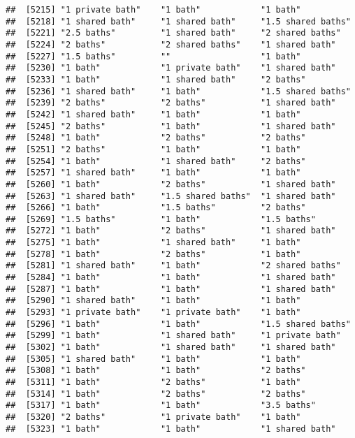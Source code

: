 \documentclass[
]{article}
\begin{document}
\begin{verbatim}
##  [5215] "1 private bath"    "1 bath"            "1 bath"           
##  [5218] "1 shared bath"     "1 shared bath"     "1.5 shared baths" 
##  [5221] "2.5 baths"         "1 shared bath"     "2 shared baths"   
##  [5224] "2 baths"           "2 shared baths"    "1 shared bath"    
##  [5227] "1.5 baths"         ""                  "1 bath"           
##  [5230] "1 bath"            "1 private bath"    "1 shared bath"    
##  [5233] "1 bath"            "1 shared bath"     "2 baths"          
##  [5236] "1 shared bath"     "1 bath"            "1.5 shared baths" 
##  [5239] "2 baths"           "2 baths"           "1 shared bath"    
##  [5242] "1 shared bath"     "1 bath"            "1 bath"           
##  [5245] "2 baths"           "1 bath"            "1 shared bath"    
##  [5248] "1 bath"            "2 baths"           "2 baths"          
##  [5251] "2 baths"           "1 bath"            "1 bath"           
##  [5254] "1 bath"            "1 shared bath"     "2 baths"          
##  [5257] "1 shared bath"     "1 bath"            "1 bath"           
##  [5260] "1 bath"            "2 baths"           "1 shared bath"    
##  [5263] "1 shared bath"     "1.5 shared baths"  "1 shared bath"    
##  [5266] "1 bath"            "1.5 baths"         "2 baths"          
##  [5269] "1.5 baths"         "1 bath"            "1.5 baths"        
##  [5272] "1 bath"            "2 baths"           "1 shared bath"    
##  [5275] "1 bath"            "1 shared bath"     "1 bath"           
##  [5278] "1 bath"            "2 baths"           "1 bath"           
##  [5281] "1 shared bath"     "1 bath"            "2 shared baths"   
##  [5284] "1 bath"            "1 bath"            "1 shared bath"    
##  [5287] "1 bath"            "1 bath"            "1 shared bath"    
##  [5290] "1 shared bath"     "1 bath"            "1 bath"           
##  [5293] "1 private bath"    "1 private bath"    "1 bath"           
##  [5296] "1 bath"            "1 bath"            "1.5 shared baths" 
##  [5299] "1 bath"            "1 shared bath"     "1 private bath"   
##  [5302] "1 bath"            "1 shared bath"     "1 shared bath"    
##  [5305] "1 shared bath"     "1 bath"            "1 bath"           
##  [5308] "1 bath"            "1 bath"            "2 baths"          
##  [5311] "1 bath"            "2 baths"           "1 bath"           
##  [5314] "1 bath"            "2 baths"           "2 baths"          
##  [5317] "1 bath"            "1 bath"            "3.5 baths"        
##  [5320] "2 baths"           "1 private bath"    "1 bath"           
##  [5323] "1 bath"            "1 bath"            "1 shared bath"    

\end{verbatim}
\end{document}

